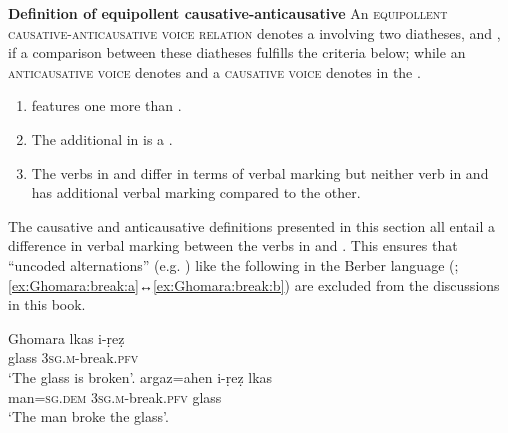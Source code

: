 \eanoraggedright
		\textbf{Definition of equipollent causative-anticausative} \newline
		An \textsc{equipollent causative-anticausative voice relation} denotes a  involving two diatheses,  and , if a comparison between these diatheses fulfills the criteria below; while an \textsc{anticausative voice} denotes  and a \textsc{causative voice} denotes  in the .
		\begin{enumerate}[label=\roman*)]
			\item {} features one  more than .
			\item The additional  in  is a .
			\item The verbs in  and  differ in terms of verbal marking but neither verb in  and  has additional verbal marking compared to the other.
		\end{enumerate}
		\label{def:equipollent:causative-anticausative}
\z

\smallskip

The causative and anticausative definitions presented in this section all entail a difference in verbal marking between the verbs in  and . This ensures that “uncoded alternations” (e.g. \citealt[181ff.]{zuniga:kittila:2019}) like the following  in the Berber language  (; \ref{ex:Ghomara:break:a}↔\ref{ex:Ghomara:break:b}) are excluded from the discussions in this book.

\ea Ghomara \citep[317]{mourigh:2015}
\ea\label{ex:Ghomara:break:a}
	\gll	lkas 	i-ṛeẓ \\
			glass	\textsc{3sg.m}-break.\textsc{pfv}	\\
	\glt	‘The glass is broken’.
\ex\label{ex:Ghomara:break:b}
	\gll	argaz=ahen 				i-ṛeẓ								lkas	\\
			man=\textsc{sg.dem}	\textsc{3sg.m}-break.\textsc{pfv}	glass	\\
	\glt	‘The man broke the glass’.
	\z 
\z


